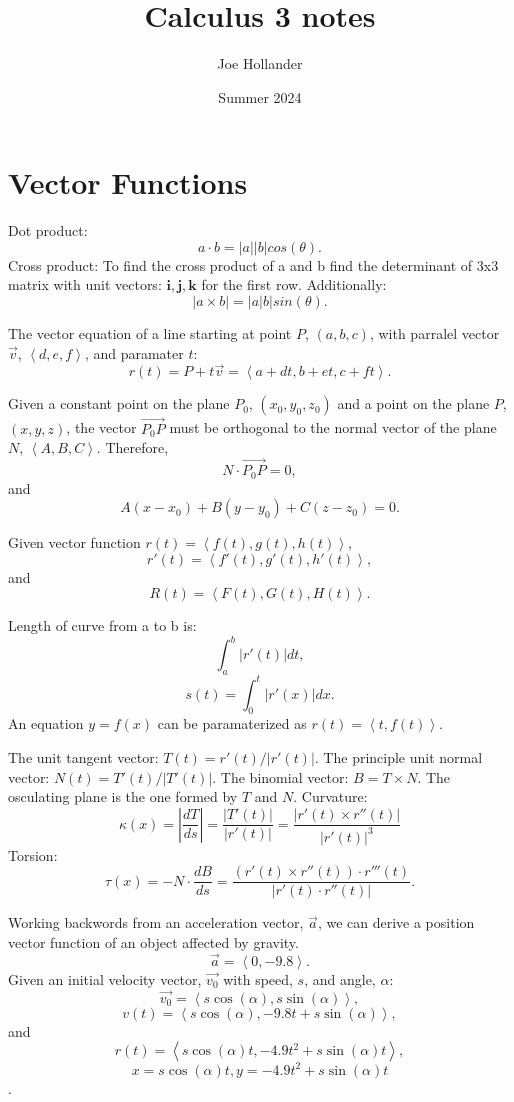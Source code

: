 \documentclass{article}
\title{Calculus 3 notes}
\author{Joe Hollander}
\date{Summer 2024}
\begin{document}
\maketitle

\newtheorem{theorem}{Theorem}[section]

\section*{Vector Functions}
\noindent Dot product: 
\[a \cdot b = |a||b|cos(\theta).\]
Cross product:
To find the cross product of a and b find the
determinant of 3x3 matrix with unit vectors: $\mathbf{i, j, k}$
for the first row. Additionally: 
\[|a \times  b| = |a|b|sin(\theta).\]

The vector equation of a line starting at point $P$, $(a, b, c)$, 
with parralel vector $\vec{v}$, $\left\langle d, e, f\right\rangle$,
and paramater $t$:
\[
r(t) = P + t\vec{v} = 
\left\langle a + dt, b + et, c + ft\right\rangle.
\]

Given a constant point on the plane $P_0$, $(x_0,y_0,z_0)$
and a point on the plane $P$, $(x,y,z)$, 
the vector $\vec{P_0P}$ must be orthogonal to the normal vector of the plane $N$, 
$\left\langle A,B,C \right\rangle$.
Therefore, \[N \cdot \vec{P_0P} = 0, \]
and \[A(x-x_0) + B(y-y_0) + C(z-z_0) = 0.\]

Given vector function $r(t) = \left\langle f(t), g(t), h(t) \right\rangle$,
\[r'(t) = \left\langle f'(t), g'(t), h'(t) \right\rangle,\] and 
\[R(t) = \left\langle F(t), G(t), H(t) \right\rangle.\]


Length of curve from a to b is: \[\int_{a}^{b} |r'(t)| dt,\]
\[s(t) = \int_{0}^{t} |r'(x)| dx.\] An equation $y = f(x)$ can be paramaterized as
$r(t) = \left\langle t, f(t) \right\rangle$. 

The unit tangent vector: $T(t) = r'(t)/|r'(t)|$.
The principle unit normal vector: $N(t) = T'(t)/|T'(t)|$.
The binomial vector: $B = T \times N$. The osculating plane is
the one formed by $T$ and $N$. 
Curvature:
\[
\kappa(x) = |\frac{dT}{ds}| = \frac{|T'(t)|}{|r'(t)|}
= \frac{|r'(t) \times r''(t)|}{|r'(t)|^3}
\]
Torsion:
\[
\tau(x) = -N \cdot \frac{dB}{ds} 
= \frac{(r'(t) \times r''(t)) \cdot r'''(t)}{|r'(t) \cdot r''(t)|}.
\]

Working backwords from an acceleration vector, $\vec{a}$,
we can derive a position vector function of an object affected 
by gravity.
\[\vec{a} = \left\langle0, -9.8\right\rangle.\]
Given an initial velocity vector, $\vec{v_0}$ with speed, $s$,
and angle, $\alpha$: 
\[\vec{v_0} = \left\langle s\cos(\alpha), s\sin(\alpha)\right\rangle,\]
\[v(t) = \left\langle s\cos(\alpha), -9.8t + s\sin(\alpha)\right\rangle,\]
and
\[r(t) = \left\langle s\cos(\alpha)t, -4.9t^2 + s\sin(\alpha)t\right\rangle,\]
\[x = s\cos(\alpha)t, y = -4.9t^2 + s\sin(\alpha)t\].
\end{document}
